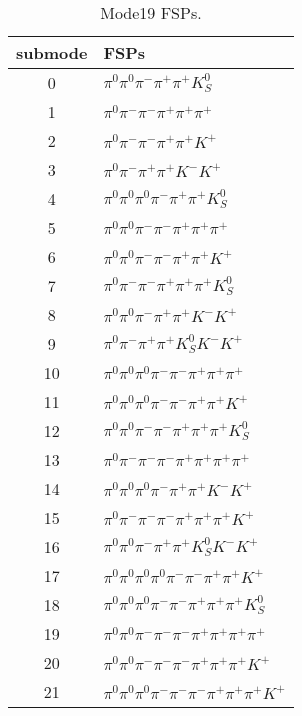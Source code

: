 \begin{table}[h!]
\begin{center}
\begin{tabular}{cl}
\hline
submode& FSPs\\
\hline
0 & $\pi^0 \pi^0 \pi^- \pi^+ \pi^+ K_S^0 $ \\
1 & $\pi^0 \pi^- \pi^- \pi^+ \pi^+ \pi^+ $ \\
2 & $\pi^0 \pi^- \pi^- \pi^+ \pi^+ K^+ $ \\
3 & $\pi^0 \pi^- \pi^+ \pi^+ K^- K^+ $ \\
4 & $\pi^0 \pi^0 \pi^0 \pi^- \pi^+ \pi^+ K_S^0 $ \\
5 & $\pi^0 \pi^0 \pi^- \pi^- \pi^+ \pi^+ \pi^+ $ \\
6 & $\pi^0 \pi^0 \pi^- \pi^- \pi^+ \pi^+ K^+ $ \\
7 & $\pi^0 \pi^- \pi^- \pi^+ \pi^+ \pi^+ K_S^0 $ \\
8 & $\pi^0 \pi^0 \pi^- \pi^+ \pi^+ K^- K^+ $ \\
9 & $\pi^0 \pi^- \pi^+ \pi^+ K_S^0 K^- K^+ $ \\
10 & $\pi^0 \pi^0 \pi^0 \pi^- \pi^- \pi^+ \pi^+ \pi^+ $ \\
11 & $\pi^0 \pi^0 \pi^0 \pi^- \pi^- \pi^+ \pi^+ K^+ $ \\
12 & $\pi^0 \pi^0 \pi^- \pi^- \pi^+ \pi^+ \pi^+ K_S^0 $ \\
13 & $\pi^0 \pi^- \pi^- \pi^- \pi^+ \pi^+ \pi^+ \pi^+ $ \\
14 & $\pi^0 \pi^0 \pi^0 \pi^- \pi^+ \pi^+ K^- K^+ $ \\
15 & $\pi^0 \pi^- \pi^- \pi^- \pi^+ \pi^+ \pi^+ K^+ $ \\
16 & $\pi^0 \pi^0 \pi^- \pi^+ \pi^+ K_S^0 K^- K^+ $ \\
17 & $\pi^0 \pi^0 \pi^0 \pi^0 \pi^- \pi^- \pi^+ \pi^+ K^+ $ \\
18 & $\pi^0 \pi^0 \pi^0 \pi^- \pi^- \pi^+ \pi^+ \pi^+ K_S^0 $ \\
19 & $\pi^0 \pi^0 \pi^- \pi^- \pi^- \pi^+ \pi^+ \pi^+ \pi^+ $ \\
20 & $\pi^0 \pi^0 \pi^- \pi^- \pi^- \pi^+ \pi^+ \pi^+ K^+ $ \\
21 & $\pi^0 \pi^0 \pi^0 \pi^- \pi^- \pi^- \pi^+ \pi^+ \pi^+ K^+ $ \\
\hline
\end{tabular}
\label{tab:Mode19FSPs}
\caption{Mode19 FSPs.}
\end{center}
\end{table}
